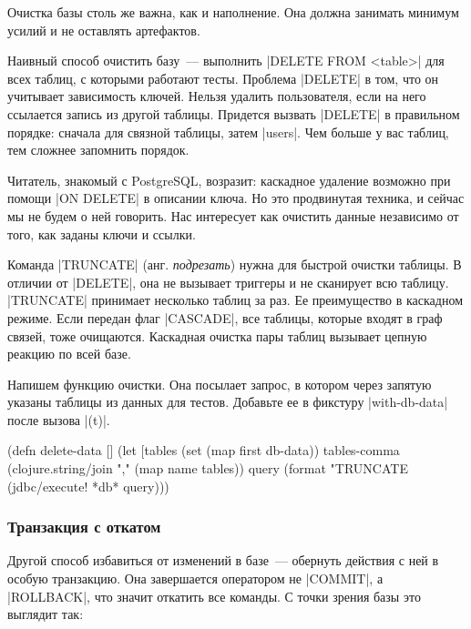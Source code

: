 Очистка базы столь же важна, как и наполнение. Она должна занимать минимум
усилий и не оставлять артефактов.

Наивный способ очистить базу~--- выполнить \spverb|DELETE FROM <table>| для всех
таблиц, с которыми работают тесты. Проблема \spverb|DELETE| в том, что он
учитывает зависимость ключей. Нельзя удалить пользователя, если на него
ссылается запись из другой таблицы. Придется вызвать \spverb|DELETE| в
правильном порядке: сначала для связной таблицы, затем \spverb|users|. Чем
больше у вас таблиц, тем сложнее запомнить порядок.

Читатель, знакомый с PostgreSQL, возразит: каскадное удаление возможно при
помощи \spverb|ON DELETE| в описании ключа. Но это продвинутая техника, и сейчас
мы не будем о ней говорить. Нас интересует как очистить данные независимо от
того, как заданы ключи и ссылки.

Команда \spverb|TRUNCATE| (анг. \emph{подрезать}) нужна для быстрой очистки
таблицы. В отличии от \spverb|DELETE|, она не вызывает триггеры и не сканирует
всю таблицу. \spverb|TRUNCATE| принимает несколько таблиц за раз. Ее
преимущество в каскадном режиме. Если передан флаг \spverb|CASCADE|, все
таблицы, которые входят в граф связей, тоже очищаются. Каскадная очистка пары
таблиц вызывает цепную реакцию по всей базе.

Напишем функцию очистки. Она посылает запрос, в котором через запятую указаны
таблицы из данных для тестов. Добавьте ее в фикстуру \spverb|with-db-data| после
вызова \spverb|(t)|.

\begin{english}
  \begin{clojure}
(defn delete-data []
  (let [tables (set (map first db-data))
        tables-comma (clojure.string/join "," (map name tables))
        query (format "TRUNCATE %
    (jdbc/execute! *db* query)))
  \end{clojure}
\end{english}

\subsubsection*{Транзакция с откатом}

Другой способ избавиться от изменений в базе~--- обернуть действия с ней в
особую транзакцию. Она завершается оператором не \spverb|COMMIT|, а
\spverb|ROLLBACK|, что значит откатить все команды. С точки зрения базы это
выглядит так:

